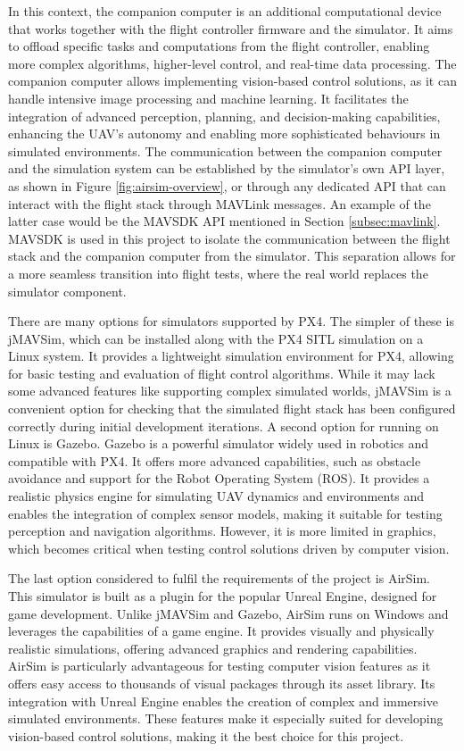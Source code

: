 In this context, the companion computer is an additional computational device that works together with the flight controller firmware and the simulator. It aims to offload specific tasks and computations from the flight controller, enabling more complex algorithms, higher-level control, and real-time data processing. The companion computer allows implementing vision-based control solutions, as it can handle intensive image processing and machine learning. It facilitates the integration of advanced perception, planning, and decision-making capabilities, enhancing the UAV's autonomy and enabling more sophisticated behaviours in simulated environments.
The communication between the companion computer and the simulation system can be established by the simulator’s own API layer, as shown in Figure \ref{fig:airsim-overview}, or through any dedicated API that can interact with the flight stack through MAVLink messages.
An example of the latter case would be the MAVSDK API mentioned in Section \ref{subsec:mavlink}.
MAVSDK is used in this project to isolate the communication between the flight stack and the companion computer from the simulator.
This separation allows for a more seamless transition into flight tests, where the real world replaces the simulator component.

There are many options for simulators supported by PX4.
The simpler of these is jMAVSim, which can be installed along with the PX4 SITL simulation on a Linux system. It provides a lightweight simulation environment for PX4, allowing for basic testing and evaluation of flight control algorithms. While it may lack some advanced features like supporting complex simulated worlds, jMAVSim is a convenient option for checking that the simulated flight stack has been configured correctly during initial development iterations.
A second option for running on Linux is Gazebo. Gazebo is a powerful simulator widely used in robotics and compatible with PX4. It offers more advanced capabilities, such as obstacle avoidance and support for the Robot Operating System (ROS). It provides a realistic physics engine for simulating UAV dynamics and environments and enables the integration of complex sensor models, making it suitable for testing perception and navigation algorithms. However, it is more limited in graphics, which becomes critical when testing control solutions driven by computer vision.

The last option considered to fulfil the requirements of the project is AirSim. This simulator is built as a plugin for the popular Unreal Engine, designed for game development. Unlike jMAVSim and Gazebo, AirSim runs on Windows and leverages the capabilities of a game engine. It provides visually and physically realistic simulations, offering advanced graphics and rendering capabilities. AirSim is particularly advantageous for testing computer vision features as it offers easy access to thousands of visual packages through its asset library. Its integration with Unreal Engine enables the creation of complex and immersive simulated environments. These features make it especially suited for developing vision-based control solutions, making it the best choice for this project.



